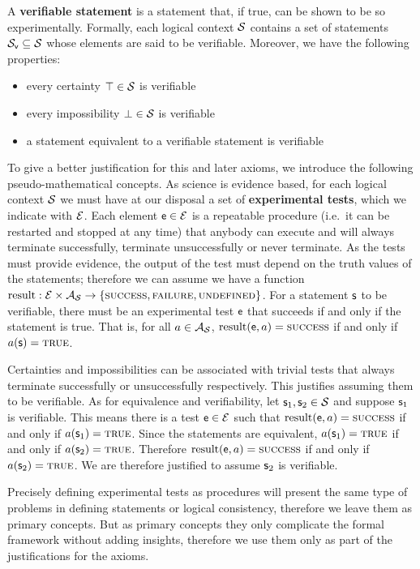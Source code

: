 	\begin{mathSection}
		\begin{axiom}\label{pm-vs-axiomVerifiability}
			A \textbf{verifiable statement} is a statement that, if true, can be shown to be so experimentally. Formally, each logical context $\mathcal{S}$ contains a set of statements $\mathcal{S}_\textsf{v} \subseteq \mathcal{S}$ whose elements are said to be verifiable. Moreover, we have the following properties:
			\begin{itemize}
				\item every certainty $\top \in \mathcal{S}$ is verifiable
				\item every impossibility $\bot \in \mathcal{S}$ is verifiable
				\item a statement equivalent to a verifiable statement is verifiable
			\end{itemize}
		\end{axiom}
		\begin{justification}
			To give a better justification for this and later axioms, we introduce the following pseudo-mathematical concepts. As science is evidence based, for each logical context $\mathcal{S}$ we must have at our disposal a set of \textbf{experimental tests}, which we indicate with $\mathcal{E}$. Each element $\mathsf{e} \in \mathcal{E}$ is a repeatable procedure (i.e.~it can be restarted and stopped at any time) that anybody can execute and will always terminate successfully, terminate unsuccessfully or never terminate. As the tests must provide evidence, the output of the test must depend on the truth values of the statements; therefore we can assume we have a function $\operatorname{result}: \mathcal{E} \times \mathcal{A}_{\mathcal{S}} \to \{\textsc{success}, \textsc{failure}, \textsc{undefined}\}$. For a statement $\mathsf{s}$ to be verifiable, there must be an experimental test $\mathsf{e}$ that succeeds if and only if the statement is true. That is, for all $a \in \mathcal{A}_{\mathcal{S}}$, $\operatorname{result}(\mathsf{e}, a) = \textsc{success}$ if and only if $a(\mathsf{s}) = \textup{\textsc{true}}$.
			
			Certainties and impossibilities can be associated with trivial tests that always terminate successfully or unsuccessfully respectively. This justifies assuming them to be verifiable. As for equivalence and verifiability, let $\mathsf{s}_1, \mathsf{s}_2 \in \mathcal{S}$ and suppose $\mathsf{s}_1$ is verifiable. This means there is a test $\mathsf{e} \in \mathcal{E}$ such that $\operatorname{result}(\mathsf{e}, a) = \textsc{success}$ if and only if $a(\mathsf{s}_1) = \textup{\textsc{true}}$. Since the statements are equivalent, $a(\mathsf{s}_1) = \textup{\textsc{true}}$ if and only if $a(\mathsf{s}_2) = \textup{\textsc{true}}$. Therefore $\operatorname{result}(\mathsf{e}, a) = \textsc{success}$ if and only if $a(\mathsf{s}_2) = \textup{\textsc{true}}$. We are therefore justified to assume $\mathsf{s}_2$ is verifiable.
			
			Precisely defining experimental tests as procedures will present the same type of problems in defining statements or logical consistency, therefore we leave them as primary concepts. But as primary concepts they only complicate the formal framework without adding insights, therefore we use them only as part of the justifications for the axioms.
		\end{justification}
	\end{mathSection}
	
